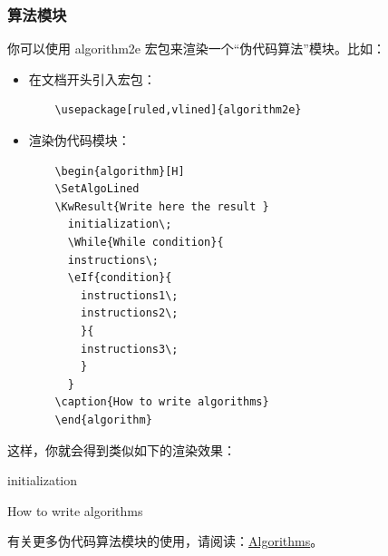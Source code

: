 \subsubsection{算法模块}

你可以使用 algorithm2e 宏包来渲染一个“伪代码算法”模块。比如：

\begin{itemize}
  \item 在文档开头引入宏包：
        \begin{verbatim}
    \usepackage[ruled,vlined]{algorithm2e}
  \end{verbatim}
  \item 渲染伪代码模块：
        \begin{verbatim}
    \begin{algorithm}[H]
    \SetAlgoLined
    \KwResult{Write here the result }
      initialization\;
      \While{While condition}{
      instructions\;
      \eIf{condition}{
        instructions1\;
        instructions2\;
        }{
        instructions3\;
        }
      }
    \caption{How to write algorithms}
    \end{algorithm}
  \end{verbatim}
\end{itemize}

这样，你就会得到类似如下的渲染效果：

\begin{algorithm}[H]
  \SetAlgoLined
  initialization\;
  \caption{How to write algorithms}
\end{algorithm}

有关更多伪代码算法模块的使用，请阅读：\href{https://www.overleaf.com/learn/latex/algorithms}{Algorithms}。
